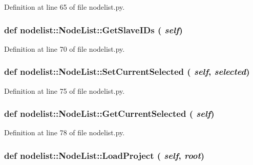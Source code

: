 Definition at line 65 of file nodelist.py.\hypertarget{classnodelist_1_1NodeList_e95b562c7c695ea8c2a3dee38b7c4ef2}{
\subsubsection[GetSlaveIDs]{\setlength{\rightskip}{0pt plus 5cm}def nodelist::Node\-List::Get\-Slave\-IDs ( {\em self})}}
\label{classnodelist_1_1NodeList_e95b562c7c695ea8c2a3dee38b7c4ef2}




Definition at line 70 of file nodelist.py.\hypertarget{classnodelist_1_1NodeList_007fad3e7173fb04f35df65d93690c19}{
\subsubsection[SetCurrentSelected]{\setlength{\rightskip}{0pt plus 5cm}def nodelist::Node\-List::Set\-Current\-Selected ( {\em self},  {\em selected})}}
\label{classnodelist_1_1NodeList_007fad3e7173fb04f35df65d93690c19}




Definition at line 75 of file nodelist.py.\hypertarget{classnodelist_1_1NodeList_31139aa84f679ccd6b60c0d2e291cead}{
\subsubsection[GetCurrentSelected]{\setlength{\rightskip}{0pt plus 5cm}def nodelist::Node\-List::Get\-Current\-Selected ( {\em self})}}
\label{classnodelist_1_1NodeList_31139aa84f679ccd6b60c0d2e291cead}




Definition at line 78 of file nodelist.py.\hypertarget{classnodelist_1_1NodeList_e0c626e2b7b68c2497f77b822b6fa88f}{
\subsubsection[LoadProject]{\setlength{\rightskip}{0pt plus 5cm}def nodelist::Node\-List::Load\-Project ( {\em self},  {\em root})}}
\label{classnodelist_1_1NodeList_e0c626e2b7b68c2497f77b822b6fa88f}




